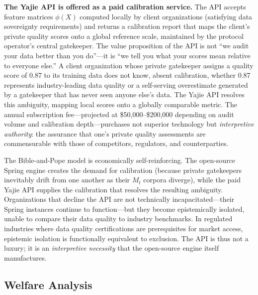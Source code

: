 \documentclass[12pt,a4paper]{article}
\theoremstyle{definition}
\theoremstyle{remark}
\begin{document}
\textbf{The Yajie API is offered as a paid calibration service.} The API accepts feature matrices $\phi(X)$ computed locally by client organizations (satisfying data sovereignty requirements) and returns a calibration report that maps the client's private quality scores onto a global reference scale, maintained by the protocol operator's central gatekeeper. The value proposition of the API is not ``we audit your data better than you do''—it is ``we tell you what your scores mean relative to everyone else.'' A client organization whose private gatekeeper assigns a quality score of 0.87 to its training data does not know, absent calibration, whether 0.87 represents industry-leading data quality or a self-serving overestimate generated by a gatekeeper that has never seen anyone else's data. The Yajie API resolves this ambiguity, mapping local scores onto a globally comparable metric. The annual subscription fee—projected at \$50,000–\$200,000 depending on audit volume and calibration depth—purchases not superior technology but \textit{interpretive authority}: the assurance that one's private quality assessments are commensurable with those of competitors, regulators, and counterparties.

The Bible-and-Pope model is economically self-reinforcing. The open-source Spring engine creates the demand for calibration (because private gatekeepers inevitably drift from one another as their $M_t$ corpora diverge), while the paid Yajie API supplies the calibration that resolves the resulting ambiguity. Organizations that decline the API are not technically incapacitated—their Spring instances continue to function—but they become epistemically isolated, unable to compare their data quality to industry benchmarks. In regulated industries where data quality certifications are prerequisites for market access, epistemic isolation is functionally equivalent to exclusion. The API is thus not a luxury; it is an \textit{interpretive necessity} that the open-source engine itself manufactures.

\subsection{Welfare Analysis}
\end{document}
